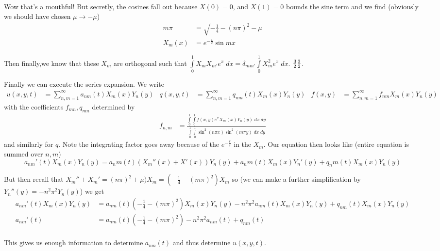 \documentclass[10pt]{report}
\begin{document}
Wow that's a mouthful! But secretly, the cosines fall out because $X(0) = 0$, and $X(1) = 0$ bounds the sine term and we find (obviously we should have chosen $\mu \to -\mu$)
\begin{align}
    m\pi &= \sqrt{-\frac{1}{4} - (n\pi)^2 - \mu}\\
    X_m(x) &= e^{-\frac{x}{2}}\sin mx
\end{align}

Then finally,we know that these $X_m$ are orthogonal such that $\int\limits_{0}^{1}X_mX_{m'}e^x\;dx = \delta_{mm'}\int\limits_{0}^{1}X_m^2e^x\;dx$. ${3 \over 2} \frac{3}{2}$.

Finally we can execute the series expansion. We write
\begin{align}
    u(x,y,t) &= \sum\limits_{n,m=1}^{\infty}a_{nm}(t)X_m(x)Y_n(y) & q(x,y,t) &=\sum\limits_{n,m=1}^{\infty}q_{nm}(t)X_m(x)Y_n(y) & f(x,y) &= \sum\limits_{n,m=1}^{\infty}f_{nm}X_m(x)Y_n(y)
\end{align}
with the coefficients $f_{mn}, q_{mn}$ determined by
\begin{align}
    f_{n,m} &= \frac{\int\limits_{0}^{1}\int\limits_{0}^{1}f(x,y)e^xX_m(x)Y_n(y)\;dx\;dy}{\int\limits_{0}^{1}\int\limits_{0}^{1}\sin^2(n\pi x)\sin^2(m\pi y)\;dx\;dy}
\end{align}
and similarly for $q$. Note the integrating factor goes away because of the $e^{-\frac{x}{2}}$ in the $X_m$. Our equation then looks like (entire equation is summed over $n,m$)
\begin{equation}
    a_{nm}'(t)X_m(x)Y_n(y) = a_nm(t)\left(X_m''(x) + X'(x)\right)Y_n(y) + a_nm(t)X_m(x)Y_n'(y) + q_nm(t)X_m(x)Y_n(y)
\end{equation}

But then recall that $X_m'' + X_m' = (n\pi)^2 + \mu)X_m = \left(-\frac{1}{4} - (m\pi)^2\right)X_m$ so (we can make a further simplification by $Y_n''(y) = -n^2\pi^2 Y_n(y)$) we get
\begin{align}
    a_{nm}'(t)X_m(x)Y_n(y) &= a_{nm}(t)\left(-\frac{1}{4} - (m\pi)^2\right)X_m(x)Y_n(y) - n^2\pi^2 a_{nm}(t)X_m(x)Y_n(y) + q_{nm}(t)X_m(x)Y_n(y)\\
    a_{nm}'(t) &= a_{nm}(t)\left(-\frac{1}{4} - (m\pi)^2\right) - n^2\pi^2 a_{nm}(t) + q_{nm}(t)\\
\end{align}

This gives us enough information to determine $a_{nm}(t)$ and thus determine $u(x,y,t)$.
\end{document}
